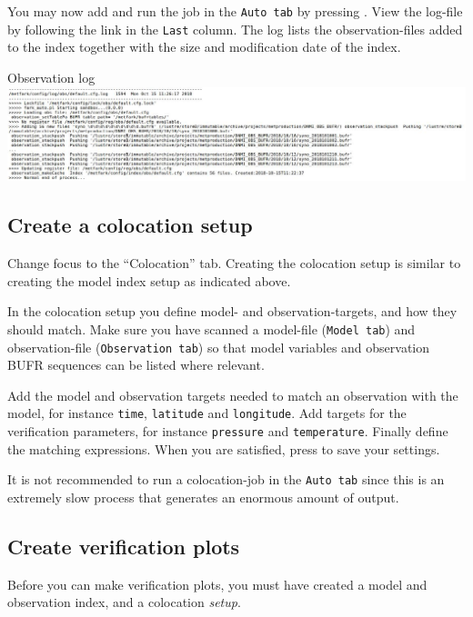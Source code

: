 \documentclass[letterpaper,10pt,twoside,twocolumn,openany]{book}
\begin{document}
{You may now add and run the job in the \lstinline!Auto tab! by pressing . View the log-file by following the link in  the \lstinline!Last! column. The log lists the observation-files added to the index together with the size and modification date of the index.
\begin{paperbox}{Observation log}
  \includegraphics[width=\columnwidth]{obslog.jpg}
\end{paperbox}

\subsection{Create a colocation setup}
Change focus to the ``Colocation'' tab. 
Creating the colocation setup is similar to creating the model index setup as indicated above.

In the colocation setup you define model- and observation-targets, and how they should match.
Make sure you have scanned a model-file (\lstinline!Model tab!)
and observation-file  (\lstinline!Observation tab!)
so that model variables and observation BUFR sequences can be listed where relevant.

Add the model and observation targets needed to match an observation with the model, for instance
\lstinline!time!, \lstinline!latitude! and \lstinline!longitude!.
Add targets for the verification parameters, for instance \lstinline!pressure! and \lstinline!temperature!. Finally define the matching expressions.
When you are satisfied, press  to save your settings.

It is not recommended to run a colocation-job in the \lstinline!Auto tab! since this is an extremely slow process that generates an enormous amount of output.

\subsection{Create verification plots}
Before you can make verification plots, you must have
created a model and observation index, and a colocation {\em setup}.

}
\end{document}
